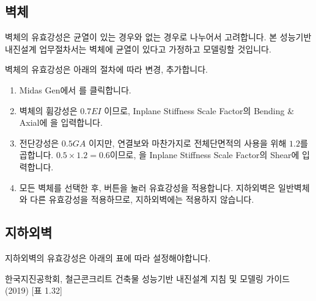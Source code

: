\documentclass[a4paper,11pt,korean,openany,oneside]{sphinxmanual}
\begin{document}
\subsection{벽체}
\label{\detokenize{1_stiffness_setting:id5}}
\sphinxAtStartPar
벽체의 유효강성은 균열이 있는 경우와 없는 경우로 나누어서 고려합니다.
본 성능기반 내진설계 업무절차서는 벽체에 균열이 있다고 가정하고 모델링할 것입니다.

\sphinxAtStartPar
벽체의 유효강성은 아래의 절차에 따라 변경, 추가합니다.

\begin{sphinxShadowBox}
\begin{enumerate}
%
\item {} 
\sphinxAtStartPar
Midas Gen에서  \sphinxhyphen{}  \sphinxhyphen{} 를 클릭합니다.

\item {} 
\sphinxAtStartPar
벽체의 휨강성은 \(0.7EI\) 이므로, Inplane Stiffness Scale Factor의 Bending \& Axial에 을 입력합니다.

\item {} 
\sphinxAtStartPar
전단강성은 \(0.5GA\) 이지만, 연결보와 마찬가지로 전체단면적의 사용을 위해 \(1.2\)를 곱합니다.
\(0.5 \times 1.2 = 0.6\)이므로, 을 Inplane Stiffness Scale Factor의 Shear에 입력합니다.

\begin{center}
\noindent{}
\end{center}

\item {} 
\sphinxAtStartPar
모든 벽체를 선택한 후,  버튼을 눌러 유효강성을 적용합니다.
지하외벽은 일반벽체와 다른 유효강성을 적용하므로, 지하외벽에는 적용하지 않습니다.

\end{enumerate}
\end{sphinxShadowBox}


\subsection{지하외벽}
\label{\detokenize{1_stiffness_setting:id6}}
\sphinxAtStartPar
지하외벽의 유효강성은 아래의 표에 따라 설정해야합니다. %
\begin{footnote}[2]\sphinxAtStartFootnote
한국지진공학회, 철근콘크리트 건축물 성능기반 내진설계 지침 및 모델링 가이드(2019) {[}표 1.3\sphinxhyphen{}2{]}
%
\end{footnote}
\end{document}
